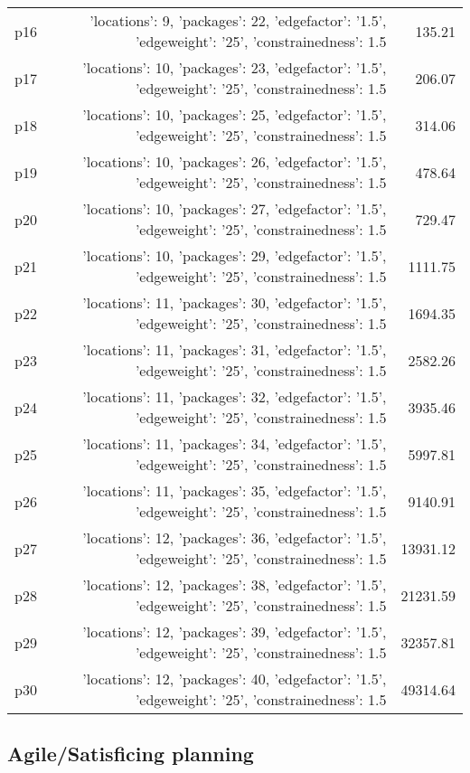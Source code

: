 \documentclass{article}
\begin{document}
\begin{center}
\begin{tabular}{@{}l|r|r@{}}
  p16&{'locations': 9, 'packages': 22, 'edgefactor': '1.5', 'edgeweight': '25', 'constrainedness': 1.5}&135.21\\
  p17&{'locations': 10, 'packages': 23, 'edgefactor': '1.5', 'edgeweight': '25', 'constrainedness': 1.5}&206.07\\
  p18&{'locations': 10, 'packages': 25, 'edgefactor': '1.5', 'edgeweight': '25', 'constrainedness': 1.5}&314.06\\
  p19&{'locations': 10, 'packages': 26, 'edgefactor': '1.5', 'edgeweight': '25', 'constrainedness': 1.5}&478.64\\
  p20&{'locations': 10, 'packages': 27, 'edgefactor': '1.5', 'edgeweight': '25', 'constrainedness': 1.5}&729.47\\
  p21&{'locations': 10, 'packages': 29, 'edgefactor': '1.5', 'edgeweight': '25', 'constrainedness': 1.5}&1111.75\\
  p22&{'locations': 11, 'packages': 30, 'edgefactor': '1.5', 'edgeweight': '25', 'constrainedness': 1.5}&1694.35\\
  p23&{'locations': 11, 'packages': 31, 'edgefactor': '1.5', 'edgeweight': '25', 'constrainedness': 1.5}&2582.26\\
  p24&{'locations': 11, 'packages': 32, 'edgefactor': '1.5', 'edgeweight': '25', 'constrainedness': 1.5}&3935.46\\
  p25&{'locations': 11, 'packages': 34, 'edgefactor': '1.5', 'edgeweight': '25', 'constrainedness': 1.5}&5997.81\\
  p26&{'locations': 11, 'packages': 35, 'edgefactor': '1.5', 'edgeweight': '25', 'constrainedness': 1.5}&9140.91\\
  p27&{'locations': 12, 'packages': 36, 'edgefactor': '1.5', 'edgeweight': '25', 'constrainedness': 1.5}&13931.12\\
  p28&{'locations': 12, 'packages': 38, 'edgefactor': '1.5', 'edgeweight': '25', 'constrainedness': 1.5}&21231.59\\
  p29&{'locations': 12, 'packages': 39, 'edgefactor': '1.5', 'edgeweight': '25', 'constrainedness': 1.5}&32357.81\\
  p30&{'locations': 12, 'packages': 40, 'edgefactor': '1.5', 'edgeweight': '25', 'constrainedness': 1.5}&49314.64
                            \end{tabular}
                            \end{center}
                    

                                \subsection*{Agile/Satisficing planning}
                                
\end{document}
